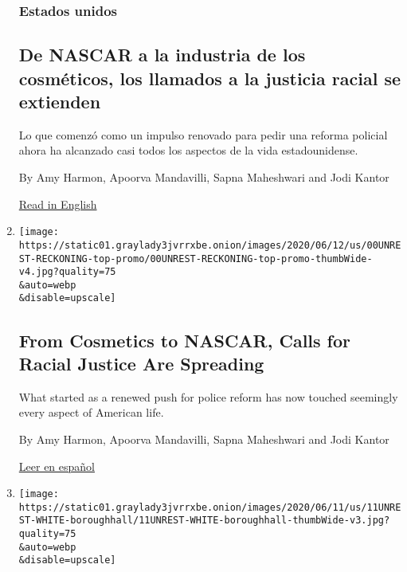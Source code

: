 \begin{enumerate}
  \hypertarget{estados-unidos}{%
  \subsubsection{Estados unidos}\label{estados-unidos}}

  \hypertarget{de-nascar-a-la-industria-de-los-cosmuxe9ticos-los-llamados-a-la-justicia-racial-se-extienden}{%
  \subsection{De NASCAR a la industria de los cosméticos, los llamados a
  la justicia racial se
  extienden}\label{de-nascar-a-la-industria-de-los-cosmuxe9ticos-los-llamados-a-la-justicia-racial-se-extienden}}

  Lo que comenzó como un impulso renovado para pedir una reforma
  policial ahora ha alcanzado casi todos los aspectos de la vida
  estadounidense.

  By Amy Harmon, Apoorva Mandavilli, Sapna Maheshwari and Jodi Kantor

  \href{https://www.nytimes3xbfgragh.onion/2020/06/13/us/george-floyd-racism-america.html}{Read
  in English}
\item
  \href{/2020/06/13/us/george-floyd-racism-america.html}{}

  \texttt{[image: https://static01.graylady3jvrrxbe.onion/images/2020/06/12/us/00UNREST-RECKONING-top-promo/00UNREST-RECKONING-top-promo-thumbWide-v4.jpg?quality=75\\\&auto=webp\\\&disable=upscale]}

  \hypertarget{from-cosmetics-to-nascar-calls-for-racial-justice-are-spreading}{%
  \subsection{From Cosmetics to NASCAR, Calls for Racial Justice Are
  Spreading}\label{from-cosmetics-to-nascar-calls-for-racial-justice-are-spreading}}

  What started as a renewed push for police reform has now touched
  seemingly every aspect of American life.

  By Amy Harmon, Apoorva Mandavilli, Sapna Maheshwari and Jodi Kantor

  \href{https://www.nytimes3xbfgragh.onion/es/2020/06/15/espanol/mundo/racismo-george-floyd-protestas.html}{Leer
  en español}
\item
  \href{/2020/06/12/us/george-floyd-white-protesters.html}{}

  \texttt{[image: https://static01.graylady3jvrrxbe.onion/images/2020/06/11/us/11UNREST-WHITE-boroughhall/11UNREST-WHITE-boroughhall-thumbWide-v3.jpg?quality=75\\\&auto=webp\\\&disable=upscale]}


\end{enumerate}
